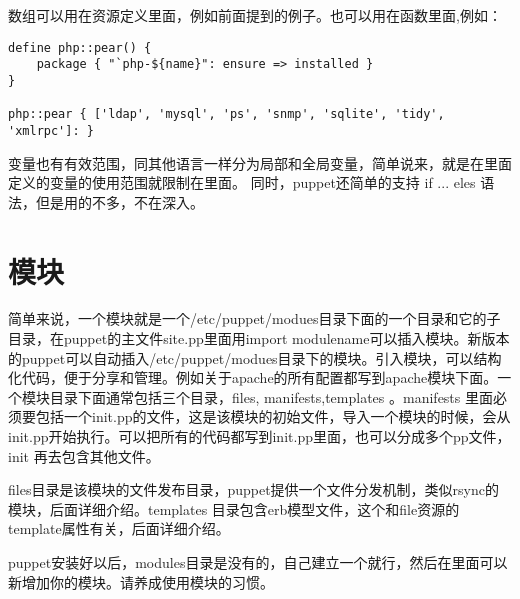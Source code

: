 数组可以用在资源定义里面，例如前面提到的例子。也可以用在函数里面,例如：
\msyh \begin{lstlisting}
define php::pear() {
    package { "`php-${name}": ensure => installed }
}

php::pear { ['ldap', 'mysql', 'ps', 'snmp', 'sqlite', 'tidy', 'xmlrpc']: }
\end{lstlisting} \song


变量也有有效范围，同其他语言一样分为局部和全局变量，简单说来，就是在{}里面定义的变量的使用范围就限制在{}里面。
同时，puppet还简单的支持 if ... eles 语法，但是用的不多，不在深入。

\section {\msyh 模块}
简单来说，一个模块就是一个/etc/puppet/modues目录下面的一个目录和它的子目录，在puppet的主文件site.pp里面用import modulename可以插入模块。新版本的puppet可以自动插入/etc/puppet/modues目录下的模块。引入模块，可以结构化代码，便于分享和管理。例如关于apache的所有配置都写到apache模块下面。一个模块目录下面通常包括三个目录，files, manifests,templates 。manifests 里面必须要包括一个init.pp的文件，这是该模块的初始文件，导入一个模块的时候，会从init.pp开始执行。可以把所有的代码都写到init.pp里面，也可以分成多个pp文件，init 再去包含其他文件。\par
files目录是该模块的文件发布目录，puppet提供一个文件分发机制，类似rsync的模块，后面详细介绍。templates 目录包含erb模型文件，这个和file资源的template属性有关，后面详细介绍。 \par
puppet安装好以后，modules目录是没有的，自己建立一个就行，然后在里面可以新增加你的模块。请养成使用模块的习惯。

